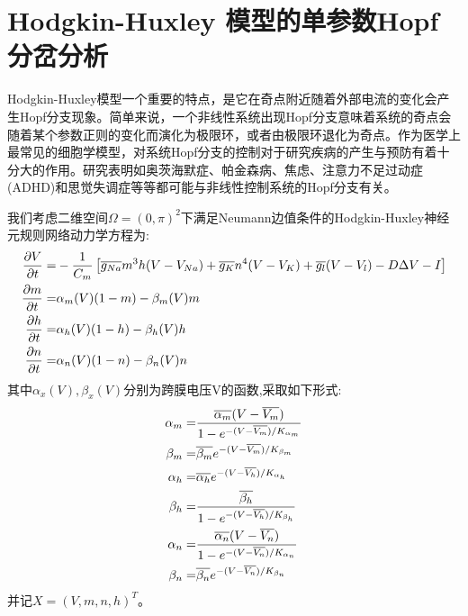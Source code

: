 \documentclass[
    bachelor,
    nofont, %
    pdflinks,
    ]{xjtuthesis}
\begin{document}
		\chapter{Hodgkin-Huxley 模型的单参数Hopf分岔分析}
    
Hodgkin-Huxley模型一个重要的特点，是它在奇点附近随着外部电流的变化会产生Hopf分支现象。简单来说，一个非线性系统出现Hopf分支意味着系统的奇点会随着某个参数正则的变化而演化为极限环，或者由极限环退化为奇点。作为医学上最常见的细胞学模型，对系统Hopf分支的控制对于研究疾病的产生与预防有着十分大的作用。研究表明如奥茨海默症、帕金森病、焦虑、注意力不足过动症(ADHD)和思觉失调症等等都可能与非线性控制系统的Hopf分支有关。

\medskip

我们考虑二维空间$\Omega=(0,\pi)^2$下满足Neumann边值条件的Hodgkin-Huxley神经元规则网络动力学方程为:
\begin{align}
\notag  \dfrac{\partial V}{\partial t} = & - \dfrac{1}{C_m} \left[ \overline{g_{Na}}m^3h(V-V_{Na})+ \overline{g_{K}}n^4(V-V_{K})+\overline{g_{l}}(V-V_{l}) -D \Delta V -I \right] \\
\dfrac{\partial m}{\partial t} = & \alpha_m (V)(1-m)-\beta_m (V)m \\
\notag \dfrac{\partial h}{\partial t} = & \alpha_h (V)(1-h)-\beta_h (V)h \\
\notag \dfrac{\partial n}{\partial t} = & \alpha_n (V)(1-n)-\beta_n (V)n 
\end{align}
其中$ \alpha_x (V), \beta_x (V)$分别为跨膜电压V的函数,采取如下形式:
\begin{align}
\notag  \alpha_m = & \dfrac{\overline{\alpha_m}(V-\overline{V_{m}} )}{1- e^{-(V-\overline{V_{m}})/K_{\alpha_m}}} \\
\notag  \beta_m =  & \overline{\beta_m} e^{-(V-\overline{V_{m}})/K_{\beta_m}}\\
\notag  \alpha_h =  & \overline{\alpha_h} e^{-(V-\overline{V_{h}})/K_{\alpha_h}}\\
\beta_h =  & \dfrac{\overline{\beta_h}}{1- e^{-(V-\overline{V_{h}})/K_{\beta_h}}} \\
\notag  \alpha_n = & \dfrac{\overline{\alpha_n}(V-\overline{V_{n}} )}{1- e^{-(V-\overline{V_{n}})/K_{\alpha_n}}} \\
\notag \beta_n =  & \overline{\beta_n} e^{-(V-\overline{V_{n}})/K_{\beta_n}}
\end{align}
并记$X=(V,m,n,h)^T$。
    
\end{document}
